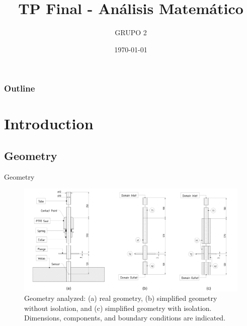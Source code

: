 \documentclass{beamer}
\title{TP Final - Análisis Matemático}
\author{GRUPO 2}
\date{\today}
\begin{document}
\begin{frame}
    \titlepage %
\end{frame}

\begin{frame}
    \scriptsize
    \frametitle{Outline}
    \tableofcontents %
\end{frame}

    
\section{Introduction}
\subsection{Geometry}
\begin{frame}{Geometry}
    \begin{figure}
        \includegraphics[width=1\linewidth]{figures/geometries-1.2.png}
        \caption{Geometry analyzed: (a) real geometry, (b) simplified geometry without isolation, and (c) simplified geometry with isolation. Dimensions, components, and boundary conditions are indicated.}
        \label{fig:figure1}
    \end{figure}

\end{frame}
\end{document}
